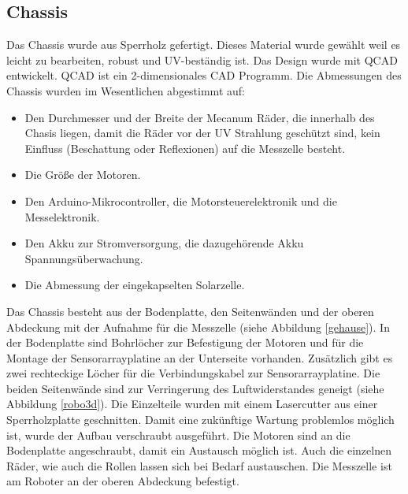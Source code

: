 \documentclass[a4paper,bibtotoc,oneside]{scrbook}
\begin{document}
\subsection{Chassis}\thispagestyle{empty}

\noindent Das Chassis wurde aus Sperrholz gefertigt. Dieses Material wurde gewählt weil es leicht zu bearbeiten, robust und UV-beständig ist. Das Design wurde mit QCAD \cite{qc} entwickelt. QCAD ist ein 2-dimensionales CAD Programm. 
Die Abmessungen des Chassis wurden im Wesentlichen abgestimmt auf: \begin{itemize}
\item Den Durchmesser und der Breite der Mecanum Räder, die innerhalb des Chasis liegen, damit die Räder vor der UV Strahlung geschützt sind, kein Einfluss (Beschattung oder Reflexionen) auf die Messzelle besteht.
\item Die Größe der Motoren.
\item Den Arduino-Mikrocontroller, die Motorsteuerelektronik und die Messelektronik.
\item Den Akku zur Stromversorgung, die dazugehörende Akku Spannungsüberwachung.
\item Die Abmessung der eingekapselten Solarzelle.
 \end{itemize}

\noindent Das Chassis besteht aus der Bodenplatte, den Seitenwänden und der oberen Abdeckung mit der Aufnahme für die Messzelle (siehe Abbildung \ref{gehause}). In der Bodenplatte sind Bohrlöcher zur Befestigung der Motoren und für die Montage der Sensorarrayplatine an der Unterseite vorhanden. Zusätzlich gibt es zwei rechteckige Löcher für die Verbindungskabel zur Sensorarrayplatine. Die beiden Seitenwände sind zur Verringerung des Luftwiderstandes geneigt (siehe Abbildung \ref{robo3d}).
\noindent Die Einzelteile wurden mit einem Lasercutter aus einer Sperrholzplatte geschnitten. Damit eine zukünftige Wartung problemlos möglich ist, wurde der Aufbau verschraubt ausgeführt. 
Die Motoren sind an die Bodenplatte angeschraubt, damit ein Austausch möglich ist. Auch die einzelnen Räder, wie auch die Rollen lassen sich bei Bedarf austauschen. 
Die Messzelle ist am Roboter an der oberen Abdeckung befestigt.
\end{document}
